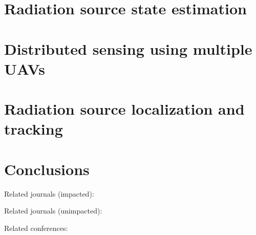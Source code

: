 \documentclass[a4paper,11pt,titlepage,twoside]{book}
\begin{document}


\clearpage


\chapter{Radiation source state estimation}

\clearpage


\chapter{Distributed sensing using multiple UAVs}

\clearpage


\chapter{Radiation source localization and tracking}

\clearpage


\chapter{Conclusions}


Related journals (impacted):
\cite{baca2019jfr}
\cite{baca2018rospix}
\cite{spurny2018jfr}
\cite{saska2016auro}
\cite{giernacky2019realtime}
\cite{chudoba2016exploration}

Related journals (unimpacted):
\cite{loianno2018localization}

Related conferences:
\cite{baca2019timepix}
\cite{baca2018mpc}
\cite{baca2016embedded}
\cite{baca2017autonomous}
\cite{saska2017documentation}
\cite{spurny2016mmar}
\cite{faigl2017onsolution}
\cite{saska2016migrating}
\end{document}
